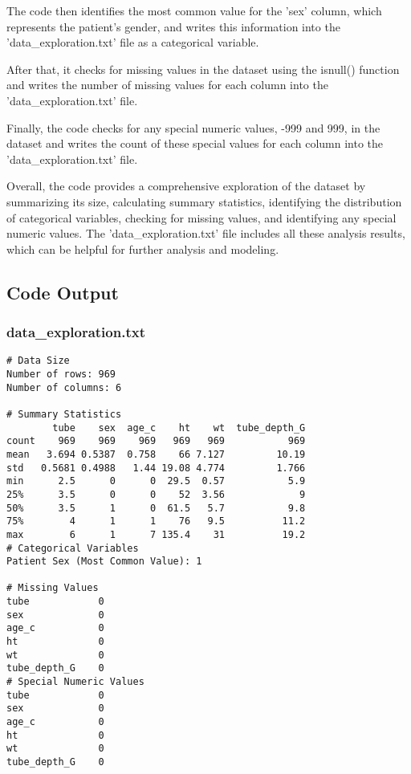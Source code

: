 \documentclass[11pt]{article}
\begin{document}
The code then identifies the most common value for the 'sex' column, which represents the patient's gender, and writes this information into the 'data\_exploration.txt' file as a categorical variable.

After that, it checks for missing values in the dataset using the isnull() function and writes the number of missing values for each column into the 'data\_exploration.txt' file.

Finally, the code checks for any special numeric values, -999 and 999, in the dataset and writes the count of these special values for each column into the 'data\_exploration.txt' file.

Overall, the code provides a comprehensive exploration of the dataset by summarizing its size, calculating summary statistics, identifying the distribution of categorical variables, checking for missing values, and identifying any special numeric values. The 'data\_exploration.txt' file includes all these analysis results, which can be helpful for further analysis and modeling.

\subsection{Code Output}

\subsubsection*{data\_exploration.txt}

\begin{Verbatim}[tabsize=4]
# Data Size
Number of rows: 969
Number of columns: 6

# Summary Statistics
        tube    sex  age_c    ht    wt  tube_depth_G
count    969    969    969   969   969           969
mean   3.694 0.5387  0.758    66 7.127         10.19
std   0.5681 0.4988   1.44 19.08 4.774         1.766
min      2.5      0      0  29.5  0.57           5.9
25%      3.5      0      0    52  3.56             9
50%      3.5      1      0  61.5   5.7           9.8
75%        4      1      1    76   9.5          11.2
max        6      1      7 135.4    31          19.2
# Categorical Variables
Patient Sex (Most Common Value): 1

# Missing Values
tube            0
sex             0
age_c           0
ht              0
wt              0
tube_depth_G    0
# Special Numeric Values
tube            0
sex             0
age_c           0
ht              0
wt              0
tube_depth_G    0
\end{Verbatim}
\end{document}
